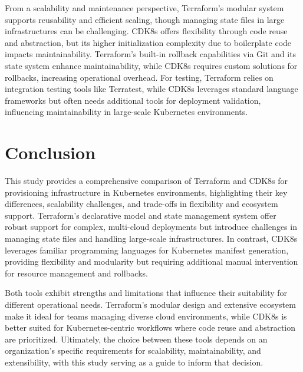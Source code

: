 \documentclass{article}
\begin{document}
From a scalability and maintenance perspective, Terraform’s modular system supports reusability and efficient scaling, though managing state files in large infrastructures can be challenging. CDK8s offers flexibility through code reuse and abstraction, but its higher initialization complexity due to boilerplate code impacts maintainability. Terraform’s built-in rollback capabilities via Git and its state system enhance maintainability, while CDK8s requires custom solutions for rollbacks, increasing operational overhead. For testing, Terraform relies on integration testing tools like Terratest, while CDK8s leverages standard language frameworks but often needs additional tools for deployment validation, influencing maintainability in large-scale Kubernetes environments.

\section{Conclusion}
\label{sec:conclusion}

This study provides a comprehensive comparison of Terraform and CDK8s for provisioning infrastructure in Kubernetes environments, highlighting their key differences, scalability challenges, and trade-offs in flexibility and ecosystem support. Terraform’s declarative model and state management system offer robust support for complex, multi-cloud deployments but introduce challenges in managing state files and handling large-scale infrastructures. In contrast, CDK8s leverages familiar programming languages for Kubernetes manifest generation, providing flexibility and modularity but requiring additional manual intervention for resource management and rollbacks.

Both tools exhibit strengths and limitations that influence their suitability for different operational needs. Terraform’s modular design and extensive ecosystem make it ideal for teams managing diverse cloud environments, while CDK8s is better suited for Kubernetes-centric workflows where code reuse and abstraction are prioritized. Ultimately, the choice between these tools depends on an organization’s specific requirements for scalability, maintainability, and extensibility, with this study serving as a guide to inform that decision.

\pagebreak
\end{document}
